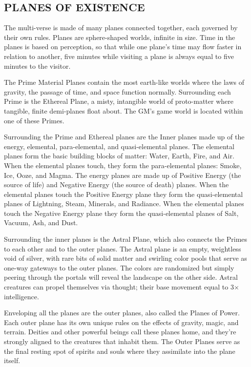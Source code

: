 \begin{multicols}{2}
 
\section{PLANES OF EXISTENCE}

The multi-verse is made of many planes connected together, each governed by their own rules.  Planes are sphere-shaped worlds, infinite in size.  Time in the planes is based on perception, so that while one plane's time may flow faster in relation to another, five minutes while visiting a plane is always equal to five minutes to the visitor.

The Prime Material Planes contain the most earth-like worlds where the laws of gravity, the passage of time, and space function normally.  Surrounding each Prime is the Ethereal Plane, a misty, intangible world of proto-matter where tangible, finite demi-planes float about.  The GM's game world is located within one of these Primes.

Surrounding the Prime and Ethereal planes are the Inner planes made up of the energy, elemental, para-elemental, and quasi-elemental planes.  The elemental planes form the basic building blocks of matter: Water, Earth, Fire, and Air.  When the elemental planes touch, they form the para-elemental planes: Smoke, Ice, Ooze, and Magma.  The energy planes are made up of Positive Energy (the source of life) and Negative Energy (the source of death) planes.  When the elemental planes touch the Positive Energy plane they form the quasi-elemental planes of Lightning, Steam, Minerals, and Radiance.  When the elemental planes touch the Negative Energy plane they form the quasi-elemental planes of Salt, Vacuum, Ash, and Dust.  

Surrounding the inner planes is the Astral Plane, which also connects the Primes to each other and to the outer planes.  The Astral plane is an empty, weightless void of silver, with rare bits of solid matter and swirling color pools that serve as one-way gateways to the outer planes.  The colors are randomized but simply peering through the portals will reveal the landscape on the other side.  Astral creatures can propel themselves via thought; their base movement equal to 3$\times$ intelligence.  

Enveloping all the planes are the outer planes, also called the Planes of Power.  Each outer plane has its own unique rules on the effects of gravity, magic, and terrain.  Deities and other powerful beings call these planes home, and they're strongly aligned to the creatures that inhabit them.  The Outer Planes serve as the final resting spot of spirits and souls where they assimilate into the plane itself.


\end{multicols}
